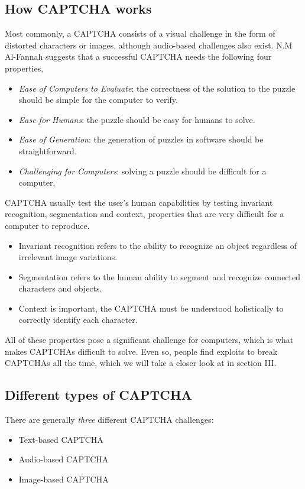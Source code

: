 \documentclass[a4paper]{IEEEtran}
\begin{document}
\subsection{How CAPTCHA works}
Most commonly, a CAPTCHA consists of a visual challenge in the form of distorted characters or images, although audio-based challenges also exist. N.M Al-Fannah suggests that a successful CAPTCHA needs the following four properties\cite{alfannah},

\begin{itemize}
\item \textit{Ease of Computers to Evaluate}: the correctness of the solution to the puzzle should be simple for the computer to verify.
\item \textit{Ease for Humans}: the puzzle should be easy for humans to solve.
\item \textit{Ease of Generation}: the generation of puzzles in software should be straightforward.
\item \textit{Challenging for Computers}: solving a puzzle should be difficult for a computer.
\end{itemize}

CAPTCHA usually test the user's human capabilities by testing invariant recognition, segmentation and context, properties that are very difficult for a computer to reproduce.

\begin{itemize}
\item Invariant recognition refers to the ability to recognize an object regardless of irrelevant image variations.
\item Segmentation refers to the human ability to segment and recognize connected characters and objects.
\item Context is important, the CAPTCHA must be understood holistically to correctly identify each character.
\end{itemize}

All of these properties pose a significant challenge for computers, which is what makes CAPTCHAs difficult to solve. Even so, people find exploits to break CAPTCHAs all the time, which we will take a closer look at in section III.

\subsection{Different types of CAPTCHA}
There are generally \textit{three} different CAPTCHA challenges:
\begin{itemize}
\item Text-based CAPTCHA
\item Audio-based CAPTCHA
\item Image-based CAPTCHA
\end{itemize}
\end{document}
